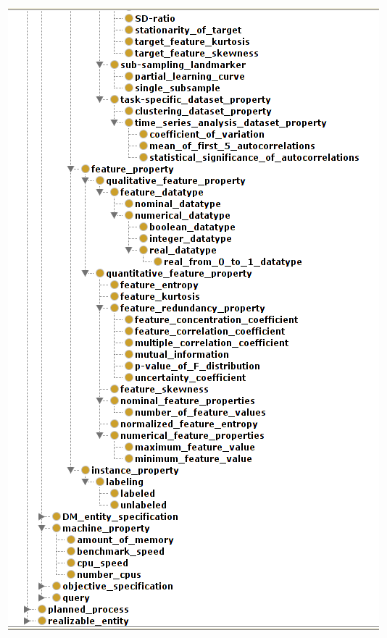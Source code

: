 \documentclass[a4paper,12pt, english]{article}
\begin{document}
\begin{figure}[h]   
  \centering 
  \includegraphics[width=0.875\textwidth]{../figs/expose2-4}
  \caption{}
  \label{fig:expose2-4}
\end{figure}
\end{document}
